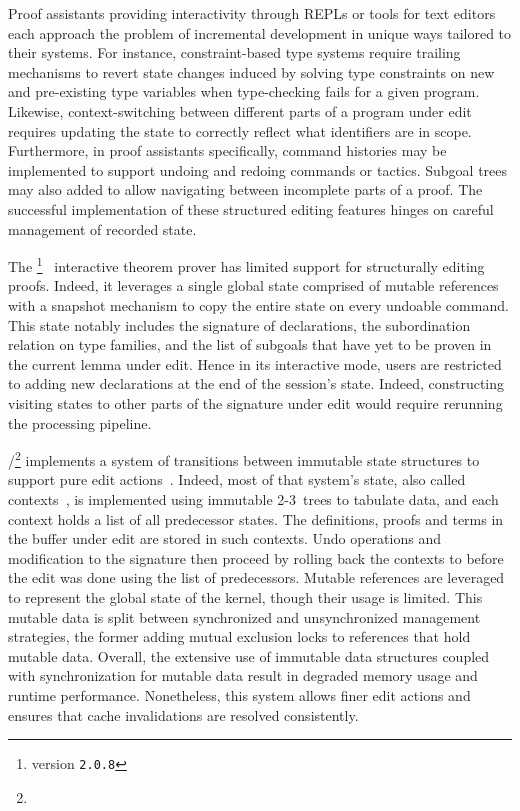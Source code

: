 Proof assistants providing interactivity through \acp{REPL} or tools for text editors each approach the problem of incremental development in unique ways tailored to their systems.
For instance, constraint-based type systems require trailing mechanisms to revert state changes induced by solving type constraints on new and pre-existing type variables when type-checking fails for a given program.
Likewise, context-switching between different parts of a program under edit requires updating the state to correctly reflect what identifiers are in scope.
Furthermore, in proof assistants specifically, command histories may be implemented to support undoing and redoing commands or tactics.
Subgoal trees may also added to allow navigating between incomplete parts of a proof.
The successful implementation of these structured editing features hinges on careful management of recorded state.

The \Abella\footnote{\Abella version \texttt{2.0.8}}~\cite{baelde2014abella} interactive theorem prover has limited support for structurally editing proofs.
Indeed, it leverages a single global state comprised of mutable references with a snapshot mechanism to copy the entire state on every undoable command.
This state notably includes the signature of declarations, the subordination relation on type families, and the list of subgoals that have yet to be proven in the current lemma under edit.
Hence in its interactive mode, \Abella users are restricted to adding new declarations at the end of the session's state.
Indeed, constructing visiting states to other parts of the signature under edit would require rerunning the processing pipeline.

\Isabelle/\Isar\footnote{} implements a system of transitions between immutable state structures to support pure edit actions~\cite{wenzel2023isabelleimpl, wenzel2023isabelleisarref, wenzel2023isabellesys}.
Indeed, most of that system's state, also called contexts~\cite{ballarin2006interpretation}, is implemented using immutable 2-3~trees to tabulate data, and each context holds a list of all predecessor states.
The definitions, proofs and terms in the buffer under edit are stored in such contexts.
Undo operations and modification to the signature then proceed by rolling back the contexts to before the edit was done using the list of predecessors.
Mutable references are leveraged to represent the global state of the kernel, though their usage is limited.
This mutable data is split between synchronized and unsynchronized management strategies, the former adding mutual exclusion locks to references that hold mutable data.
Overall, the extensive use of immutable data structures coupled with synchronization for mutable data result in degraded memory usage and runtime performance.
Nonetheless, this system allows finer edit actions and ensures that cache invalidations are resolved consistently.


